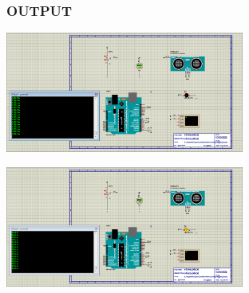 \documentclass[
	11pt, %
	t, %
	aspectratio=169, %
]{beamer}
\begin{document}
\begin{frame}
	\frametitle{OUTPUT}
	\bigskip  
		\begin{center}
		\begin{minipage}{0.45\textwidth}
			\includegraphics[height=150px,width=\textwidth]{beforeA.png}
		\end{minipage} \hspace{0.5cm}
		\begin{minipage}{0.45\textwidth}
			\includegraphics[height=150px,width=\textwidth]{afterA.png}
		\end{minipage}
		\label{name_label}
	\end{center}
\end{frame}

\end{document}
